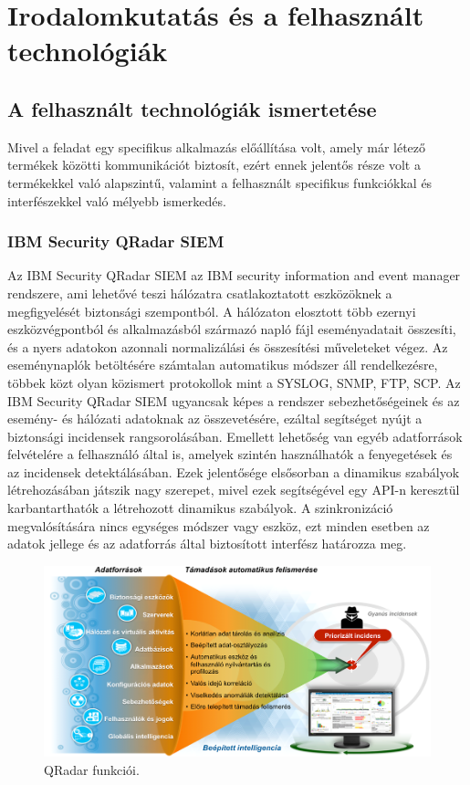 \chapter{Irodalomkutatás és a felhasznált technológiák}
\label{ch:tech}
\section{A felhasznált technológiák ismertetése}
Mivel a feladat egy specifikus alkalmazás előállítása volt, amely már létező termékek közötti kommunikációt biztosít, ezért ennek jelentős része volt a termékekkel való alapszintű, valamint a felhasznált specifikus funkciókkal és interfészekkel való mélyebb ismerkedés.


\subsection{IBM Security QRadar SIEM}
\label{subsec:qradar}
Az IBM Security QRadar SIEM az IBM security information and event manager rendszere, ami lehetővé teszi hálózatra csatlakoztatott eszközöknek a megfigyelését biztonsági szempontból. A hálózaton elosztott több ezernyi eszközvégpontból és alkalmazásból származó napló fájl eseményadatait összesíti, és a nyers adatokon azonnali normalizálási és összesítési műveleteket végez. Az eseménynaplók betöltésére számtalan automatikus módszer áll rendelkezésre, többek közt olyan közismert protokollok mint a SYSLOG, SNMP, FTP, SCP. Az IBM Security QRadar SIEM ugyancsak képes a rendszer sebezhetőségeinek és az esemény- és hálózati adatoknak az összevetésére, ezáltal segítséget nyújt a biztonsági incidensek rangsorolásában. Emellett lehetőség van egyéb adatforrások felvételére a felhasználó által is, amelyek szintén használhatók a fenyegetések és az incidensek detektálásában. Ezek jelentősége elsősorban a dinamikus szabályok létrehozásában játszik nagy szerepet, mivel ezek segítségével egy API-n keresztül karbantarthatók a létrehozott dinamikus szabályok. A szinkronizáció megvalósítására nincs egységes módszer vagy eszköz, ezt minden esetben az adatok jellege és az adatforrás által biztosított interfész határozza meg.

\begin{figure}
	\centering
	\includegraphics[width=0.9\linewidth]{figures/QRadar_promo.png}
	\caption{QRadar funkciói.}
	\label{fig:qradar-promo}
\end{figure}

